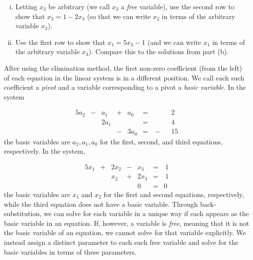 \begin{activity}
\begin{enumerate}[i.]
		\item Letting $x_3$ be arbitrary (we call $x_3$ a \emph{free} variable), use the second row to show that $x_2 = 1-2x_3$ (so that we can write $x_2$ in terms of the arbitrary variable $x_3$). 
	


		\item Use the first row to show that $x_1 = 5x_3-1$ (and we can write $x_1$ in terms of the arbitrary variable $x_3$). Compare this to the solutions from part (b). 



		\end{enumerate}
	\ea
	
\end{activity}



After using the elimination method, the first non-zero coefficient (from the left) of each equation in the linear system is in a different position. We call each such coefficient a \emph{pivot} and a variable corresponding to a pivot a \emph{basic variable}. In the system

\begin{alignat*}{5}
{}a_2	&{}-{} 	&{}a_1 		&{}+{}	&{}a_0 	&{}= & \ {}&&{}2   \\
{}	 		&{}		&{2}a_1		&{}		&{}	 	&{}= & \ {}&&{}4    \\
{} 		&{} 		&{} 			&{}-{}	&{3}a_0	&{}= & \ {-}&&{15}
\end{alignat*} 
the basic variables are $a_2, a_1, a_0$ for the first, second, and third equations, respectively. In the system, 

\begin{alignat*}{5}
{}x_1	&{}+{} 	&{2}x_2 	&{}-{}	&{}x_3 	&{}= & \ 1   \\
{}	 		&{}		&{}x_2 		&{}+{}	&{2}x_3	&{}= & \ 1    \\
{} 		&{} 		&{} 			&{}		&{}0 	&{}= & 0
\end{alignat*} 
the basic variables are $x_1$ and $x_2$ for the first and second equations, respectively, while the third equation does not have a basic variable. Through back-substitution, we can solve for each variable in a unique way if each appears as the basic variable in an equation. If, however, a variable is \emph{free}, meaning that it is not the basic variable of an equation, we cannot solve for that variable explicitly. We instead assign a distinct parameter to each such free variable and solve for the basic variables in terms of these parameters. 



